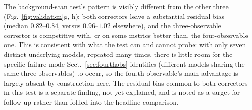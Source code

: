 \documentclass{aa}
\begin{document}
The background-scan test's pattern is visibly different from the other
three (Fig.~\ref{fig:validation}g, h): both correctors leave a substantial
residual bias (median $0.82$--$0.84$, versus $0.96$--$1.02$ elsewhere),
and the three-observable corrector is competitive with, or on some metrics
better than, the four-observable one. This is consistent with what the
test can and cannot probe: with only seven distinct underlying models,
repeated many times, there is little room for the specific failure mode
Sect.~\ref{sec:fourthobs} identifies (different models sharing the same
three observables) to occur, so the fourth observable's main advantage is
largely absent by construction here. The residual bias common to both
correctors in this test is a separate finding, not yet explained, and is
noted as a target for follow-up rather than folded into the headline
comparison.
\end{document}
